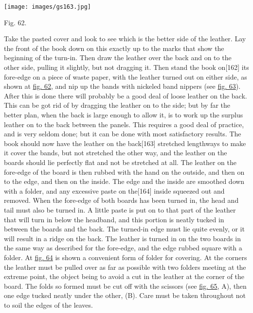 \documentclass[
]{article}
\begin{document}
\protect\hypertarget{Fig_62}{}{}
\texttt{[image: images/gs163.jpg]}

Fig. 62.

Take the pasted cover and look to see which is the better side of the
leather. Lay the front of the book down on this exactly up to the marks
that show the beginning of the turn-in. Then draw the leather over the
back and on to the other side, pulling it slightly, but not dragging it.
Then stand the book on{\protect\hypertarget{Page_162}{}{{[}162{]}}} its
fore-edge on a piece of waste paper, with the leather turned out on
either side, as shown at \protect\hyperlink{Fig_62}{fig. 62}, and nip up
the bands with nickeled band nippers (see
\protect\hyperlink{Fig_63}{fig. 63}). After this is done there will
probably be a good deal of loose leather on the back. This can be got
rid of by dragging the leather on to the side; but by far the better
plan, when the back is large enough to allow it, is to work up the
surplus leather on to the back between the panels. This requires a good
deal of practice, and is very seldom done; but it can be done with most
satisfactory results. The book should now have the leather on the
back{\protect\hypertarget{Page_163}{}{{[}163{]}}} stretched lengthways
to make it cover the bands, but not stretched the other way, and the
leather on the boards should lie perfectly flat and not be stretched at
all. The leather on the fore-edge of the board is then rubbed with the
hand on the outside, and then on to the edge, and then on the inside.
The edge and the inside are smoothed down with a folder, and any
excessive paste on the{\protect\hypertarget{Page_164}{}{{[}164{]}}}
inside squeezed out and removed. When the fore-edge of both boards has
been turned in, the head and tail must also be turned in. A little paste
is put on to that part of the leather that will turn in below the
headband, and this portion is neatly tucked in between the boards and
the back. The turned-in edge must lie quite evenly, or it will result in
a ridge on the back. The leather is turned in on the two boards in the
same way as described for the fore-edge, and the edge rubbed square with
a folder. At \protect\hyperlink{Fig_64}{fig. 64} is shown a convenient
form of folder for covering. At the corners the leather must be pulled
over as far as possible with two folders meeting at the extreme point,
the object being to avoid a cut in the leather at the corner of the
board. The folds so formed must be cut off with the scissors (see
\protect\hyperlink{Fig_65}{fig. 65}, A), then one edge tucked neatly
under the other, (B). Care must be taken throughout not to soil the
edges of the leaves.
\end{document}
